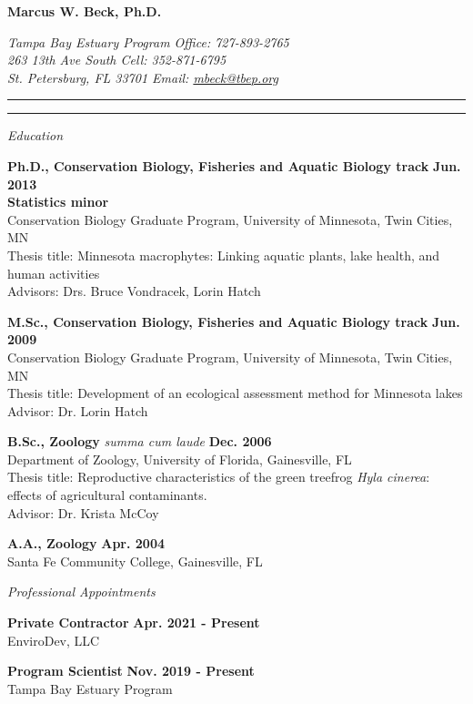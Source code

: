 \documentclass[letterpaper,12pt]{article}
\newcommand{\sectitle}[1]{\vspace{\baselineskip} \centerline{\large{\textit{#1}}}}
\begin{document}
\raggedright

\LARGE
\centerline{{\bf Marcus W. Beck, Ph.D.}}
\normalsize
\textit{Tampa Bay Estuary Program \hfill Office: 727-893-2765 \\
263 13th Ave South \hfill Cell: 352-871-6795 \\
St. Petersburg, FL 33701 \hfill Email: \href{mailto:mbeck@tbep.org}{mbeck@tbep.org}}
\vspace{4pt}
\hrule
\vspace{2pt}
\hrule
\vspace{4pt}

\small

\sectitle{Education}

{\bf Ph.D., Conservation Biology, Fisheries and Aquatic Biology track} \hfill {\bf Jun. 2013} \\
{\bf Statistics minor} \\
Conservation Biology Graduate Program, University of Minnesota, Twin Cities, MN \\
Thesis title: Minnesota macrophytes: Linking aquatic plants, lake health, and human activities \\
Advisors: Drs. Bruce Vondracek, Lorin Hatch

{\bf M.Sc., Conservation Biology, Fisheries and Aquatic Biology track} \hfill {\bf Jun. 2009} \\
Conservation Biology Graduate Program, University of Minnesota, Twin Cities, MN \\
Thesis title: Development of an ecological assessment method for Minnesota lakes\\
Advisor: Dr. Lorin Hatch

{\bf B.Sc., Zoology} \textit{summa cum laude} \hfill {\bf Dec. 2006} \\
Department of Zoology, University of Florida, Gainesville, FL \\
Thesis title: Reproductive characteristics of the green treefrog \textit{Hyla cinerea}: effects of agricultural contaminants. \\
Advisor: Dr. Krista McCoy

{\bf A.A., Zoology} \hfill {\bf Apr. 2004} \\
Santa Fe Community College, Gainesville, FL

\sectitle{Professional Appointments}

{\bf Private Contractor} \hfill {\bf Apr. 2021 - Present}\\
EnviroDev, LLC

{\bf Program Scientist} \hfill {\bf Nov. 2019 - Present}\\
Tampa Bay Estuary Program
\end{document}
